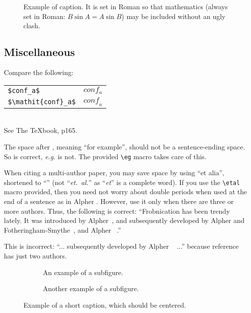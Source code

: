 \documentclass[10pt,twocolumn,letterpaper]{article}
\begin{document}
\begin{figure}[t]
  \centering
  \fbox{\rule{0pt}{2in} \rule{0.9\linewidth}{0pt}}

   \caption{Example of caption.
   It is set in Roman so that mathematics (always set in Roman: $B \sin A = A \sin B$) may be included without an ugly clash.}
   \label{fig:onecol}
\end{figure}

\subsection{Miscellaneous}

\noindent
Compare the following:\\
\begin{tabular}{ll}
 \verb'$conf_a$' &  $conf_a$ \\
 \verb'$\mathit{conf}_a$' & $\mathit{conf}_a$
\end{tabular}\\
See The \TeX book, p165.

The space after \eg, meaning ``for example'', should not be a sentence-ending space.
So \eg is correct, {\em e.g.} is not.
The provided \verb'\eg' macro takes care of this.

When citing a multi-author paper, you may save space by using ``et alia'', shortened to ``\etal'' (not ``{\em et.\ al.}'' as ``{\em et}'' is a complete word).
If you use the \verb'\etal' macro provided, then you need not worry about double periods when used at the end of a sentence as in Alpher \etal.
However, use it only when there are three or more authors.
Thus, the following is correct:
   ``Frobnication has been trendy lately.
   It was introduced by Alpher~\cite{Alpher02}, and subsequently developed by
   Alpher and Fotheringham-Smythe~\cite{Alpher03}, and Alpher \etal~\cite{Alpher04}.''

This is incorrect: ``... subsequently developed by Alpher \etal~\cite{Alpher03} ...'' because reference~\cite{Alpher03} has just two authors.




\begin{figure*}
  \centering
  \begin{subfigure}{0.68\linewidth}
    \fbox{\rule{0pt}{2in} \rule{.9\linewidth}{0pt}}
    \caption{An example of a subfigure.}
    \label{fig:short-a}
  \end{subfigure}
  \hfill
  \begin{subfigure}{0.28\linewidth}
    \fbox{\rule{0pt}{2in} \rule{.9\linewidth}{0pt}}
    \caption{Another example of a subfigure.}
    \label{fig:short-b}
  \end{subfigure}
  \caption{Example of a short caption, which should be centered.}
  \label{fig:short}
\end{figure*}
\end{document}
